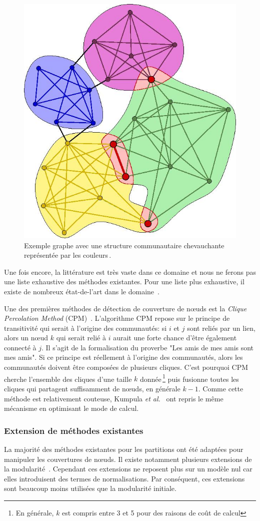 \begin{figure}
	\centering
	\includegraphics[width=0.31\linewidth]{img/Intro/Illustration_of_overlapping_communities.jpg}
	\caption{Exemple graphe avec une structure communautaire chevauchante représentée par les couleurs\,\protect\footnotemark.}
	\label{fig:ex_overlap_communaute}
\end{figure}

Une fois encore, la littérature est très vaste dans ce domaine et nous ne ferons pas une liste exhaustive des méthodes existantes.
Pour une liste plus exhaustive, il existe de nombreux état-de-l'art dans le domaine~\cite{ Kanawati2014, Xie2013,Bandyopadhyay2015, Hric2014a}.

Une des premières méthodes de détection de couverture de n\oe uds est la \emph{Clique Percolation Method} (CPM)~\cite{Palla2005}.
L'algorithme CPM repose sur le principe de transitivité qui serait à l'origine des communautés: si $i$ et $j$ sont reliés par un lien, alors un n\oe ud $k$ qui serait relié à $i$ aurait une forte chance d'être également connecté à $j$.
Il s'agit de la formalisation du proverbe "Les amis de mes amis sont mes amis".
Si ce principe est réellement à l'origine des communautés, alors les communautés doivent être composées de plusieurs cliques.
C'est pourquoi CPM cherche l'ensemble des cliques d'une taille $k$ donnée\,\footnote{En générale, $k$ est compris entre 3 et 5 pour des raisons de coût de calcul} puis fusionne toutes les cliques qui partagent suffisamment de n\oe uds, en générale $k-1$. 
Comme cette méthode est relativement couteuse, Kumpula \emph{et al.}~\cite{Kumpula2008} ont repris le même mécanisme en optimisant le mode de calcul.

\subsubsection{Extension de méthodes existantes}

La majorité des méthodes existantes pour les partitions ont été adaptées pour manipuler les couvertures de n\oe uds.
Il existe notamment plusieurs extensions de la modularité~\cite{Shen2009,Nicosia2009}.
Cependant ces extensions ne reposent plus sur un modèle nul car elles introduisent des termes de normalisations.
Par conséquent, ces extensions sont beaucoup moins utilisées que la modularité initiale.

